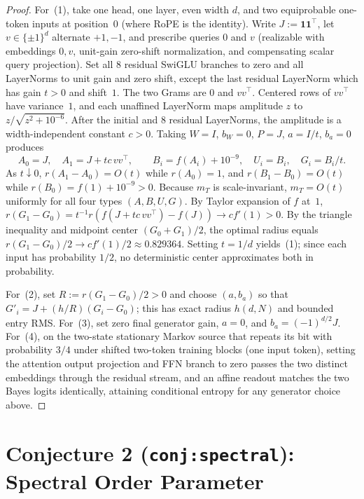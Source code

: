\documentclass[11pt]{article}
\theoremstyle{plain}
\theoremstyle{definition}
\theoremstyle{remark}
\begin{document}
\begin{proof}
For~(1), take one head, one layer, even width $d$, and two equiprobable one-token inputs at position~$0$ (where RoPE is the identity). Write $J := \mathbf{1}\mathbf{1}^\top$, let $v \in \{\pm 1\}^d$ alternate $+1, -1$, and prescribe queries $0$ and $v$ (realizable with embeddings $0, v$, unit-gain zero-shift normalization, and compensating scalar query projection). Set all $8$ residual SwiGLU branches to zero and all LayerNorms to unit gain and zero shift, except the last residual LayerNorm which has gain $t > 0$ and shift~$1$.
The two Grams are $0$ and $v v^\top$. Centered rows of $v v^\top$ have variance~$1$, and each unaffined LayerNorm maps amplitude $z$ to $z / \sqrt{z^2 + 10^{-6}}$. After the initial and $8$ residual LayerNorms, the amplitude is a width-independent constant $c > 0$. Taking $W = I$, $b_W = 0$, $P = J$, $a = I/t$, $b_a = 0$ produces
\[
A_0 = J, \quad A_1 = J + t c\, v v^\top, \qquad
B_i = f(A_i) + 10^{-9}, \quad U_i = B_i, \quad G_i = B_i / t.
\]
As $t \downarrow 0$, $r(A_1 - A_0) = O(t)$ while $r(A_0) = 1$, and $r(B_1 - B_0) = O(t)$ while $r(B_0) = f(1) + 10^{-9} > 0$. Because $m_T$ is scale-invariant, $m_T = O(t)$ uniformly for all four types $(A, B, U, G)$. By Taylor expansion of $f$ at~$1$, $r(G_1 - G_0) = t^{-1} r(f(J + tc\,vv^\top) - f(J)) \to c f'(1) > 0$. By the triangle inequality and midpoint center $(G_0 + G_1)/2$, the optimal radius equals $r(G_1 - G_0)/2 \to c f'(1)/2 \approx 0.829364$. Setting $t = 1/d$ yields~(1); since each input has probability $1/2$, no deterministic center approximates both in probability.

For~(2), set $R := r(G_1 - G_0)/2 > 0$ and choose $(a, b_a)$ so that $G'_i = J + (h/R)(G_i - G_0)$; this has exact radius $h(d, N)$ and bounded entry RMS. For~(3), set zero final generator gain, $a = 0$, and $b_a = (-1)^{d/2} J$. For~(4), on the two-state stationary Markov source that repeats its bit with probability $3/4$ under shifted two-token training blocks (one input token), setting the attention output projection and FFN branch to zero passes the two distinct embeddings through the residual stream, and an affine readout matches the two Bayes logits identically, attaining conditional entropy for any generator choice above.
\end{proof}

\section{Conjecture 2 (\texttt{conj:spectral}): Spectral Order Parameter}
\end{document}
